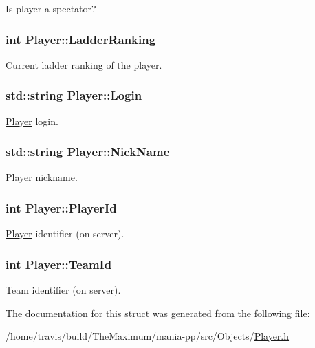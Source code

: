 Is player a spectator? 

\hypertarget{structPlayer_a25fe69852f0e38f541ad615cd59877ef}{
\subsubsection[{Ladder\-Ranking}]{\setlength{\rightskip}{0pt plus 5cm}int Player\-::\-Ladder\-Ranking}}\label{structPlayer_a25fe69852f0e38f541ad615cd59877ef}


Current ladder ranking of the player. 

\hypertarget{structPlayer_a38398818d43e186aa982a788744792d7}{
\subsubsection[{Login}]{\setlength{\rightskip}{0pt plus 5cm}std\-::string Player\-::\-Login}}\label{structPlayer_a38398818d43e186aa982a788744792d7}


\hyperlink{structPlayer}{Player} login. 

\hypertarget{structPlayer_a553cc1b0aa79108b511ba408210582cf}{
\subsubsection[{Nick\-Name}]{\setlength{\rightskip}{0pt plus 5cm}std\-::string Player\-::\-Nick\-Name}}\label{structPlayer_a553cc1b0aa79108b511ba408210582cf}


\hyperlink{structPlayer}{Player} nickname. 

\hypertarget{structPlayer_a6a71d7d9837a0a12e52ca47930965e0f}{
\subsubsection[{Player\-Id}]{\setlength{\rightskip}{0pt plus 5cm}int Player\-::\-Player\-Id}}\label{structPlayer_a6a71d7d9837a0a12e52ca47930965e0f}


\hyperlink{structPlayer}{Player} identifier (on server). 

\hypertarget{structPlayer_a350919664ba73d6d6cd6d03bd2a5cacd}{
\subsubsection[{Team\-Id}]{\setlength{\rightskip}{0pt plus 5cm}int Player\-::\-Team\-Id}}\label{structPlayer_a350919664ba73d6d6cd6d03bd2a5cacd}


Team identifier (on server). 



The documentation for this struct was generated from the following file\-:\begin{DoxyCompactItemize}
\item 
/home/travis/build/\-The\-Maximum/mania-\/pp/src/\-Objects/\hyperlink{Player_8h}{Player.\-h}\end{DoxyCompactItemize}
